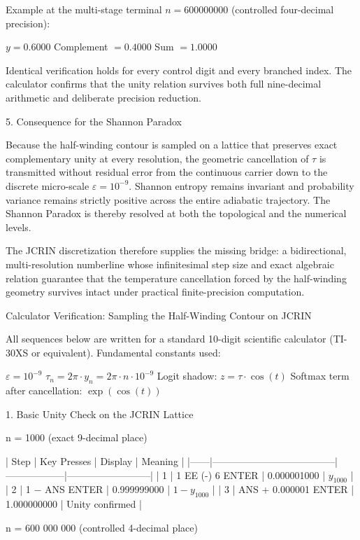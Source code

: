 Example at the multi-stage terminal \(n=600000000\) (controlled four-decimal precision):

\(y = 0.6000\)
Complement \(= 0.4000\)
Sum \(= 1.0000\)

Identical verification holds for every control digit and every branched index. The calculator confirms that the unity relation survives both full nine-decimal arithmetic and deliberate precision reduction.

5. Consequence for the Shannon Paradox

Because the half-winding contour is sampled on a lattice that preserves exact complementary unity at every resolution, the geometric cancellation of \(\tau\) is transmitted without residual error from the continuous carrier down to the discrete micro-scale \(\varepsilon=10^{-9}\). Shannon entropy remains invariant and probability variance remains strictly positive across the entire adiabatic trajectory. The Shannon Paradox is thereby resolved at both the topological and the numerical levels.

The JCRIN discretization therefore supplies the missing bridge: a bidirectional, multi-resolution numberline whose infinitesimal step size and exact algebraic relation guarantee that the temperature cancellation forced by the half-winding geometry survives intact under practical finite-precision computation.

Calculator Verification: Sampling the Half-Winding Contour on JCRIN

All sequences below are written for a standard 10-digit scientific calculator (TI-30XS or equivalent).  
Fundamental constants used:

\(\varepsilon = 10^{-9}\)
\(\tau_n = 2\pi \cdot y_n = 2\pi \cdot n \cdot 10^{-9}\)
Logit shadow: \(z = \tau \cdot \cos(t)\)
Softmax term after cancellation: \(\exp(\cos(t))\)

1. Basic Unity Check on the JCRIN Lattice

n = 1000 (exact 9-decimal place)

| Step | Key Presses                          | Display          | Meaning                  |
|------|--------------------------------------|------------------|--------------------------|
| 1    | 1 EE (-) 6 ENTER           | 0.000001000     | \(y_{1000}\)            |
| 2    | 1 − ANS ENTER                | 0.999999000     | \(1 - y_{1000}\)        |
| 3    | ANS + 0.000001 ENTER         | 1.000000000     | Unity confirmed         |

n = 600 000 000 (controlled 4-decimal place)

